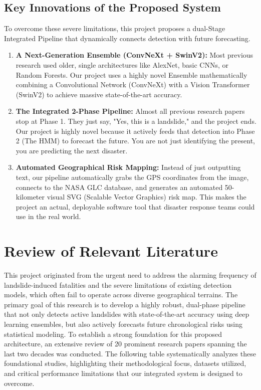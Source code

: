 \documentclass[11pt,a4paper]{article}
\begin{document}
\subsection*{Key Innovations of the Proposed System}
To overcome these severe limitations, this project proposes a dual-Stage Integrated Pipeline that dynamically connects detection with future forecasting.
\begin{enumerate}
    \item \textbf{A Next-Generation Ensemble (ConvNeXt + SwinV2):} Most previous research used older, single architectures like AlexNet, basic CNNs, or Random Forests. Our project uses a highly novel Ensemble mathematically combining a Convolutional Network (ConvNeXt) with a Vision Transformer (SwinV2) to achieve massive state-of-the-art accuracy.
    \item \textbf{The Integrated 2-Phase Pipeline:} Almost all previous research papers stop at Phase 1. They just say, "Yes, this is a landslide," and the project ends. Our project is highly novel because it actively feeds that detection into Phase 2 (The HMM) to forecast the future. You are not just identifying the present, you are predicting the next disaster.
    \item \textbf{Automated Geographical Risk Mapping:} Instead of just outputting text, our pipeline automatically grabs the GPS coordinates from the image, connects to the NASA GLC database, and generates an automated 50-kilometer visual SVG (Scalable Vector Graphics) risk map. This makes the project an actual, deployable software tool that disaster response teams could use in the real world.
\end{enumerate}
\section{Review of Relevant Literature}

This project originated from the urgent need to address the alarming frequency of landslide-induced fatalities and the severe limitations of existing detection models, which often fail to operate across diverse geographical terrains. The primary goal of this research is to develop a highly robust, dual-phase pipeline that not only detects active landslides with state-of-the-art accuracy using deep learning ensembles, but also actively forecasts future chronological risks using statistical modeling. To establish a strong foundation for this proposed architecture, an extensive review of 20 prominent research papers spanning the last two decades was conducted. The following table systematically analyzes these foundational studies, highlighting their methodological focus, datasets utilized, and critical performance limitations that our integrated system is designed to overcome.
\end{document}
